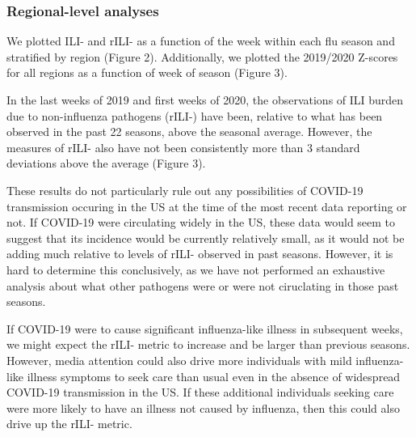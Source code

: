 \documentclass[]{article}
\begin{document}
\hypertarget{regional-level-analyses}{%
\subsubsection{Regional-level analyses}\label{regional-level-analyses}}

We plotted ILI- and rILI- as a function of the week within each flu
season and stratified by region (Figure 2). Additionally, we plotted the
2019/2020 Z-scores for all regions as a function of week of season
(Figure 3).

In the last weeks of 2019 and first weeks of 2020, the observations of
ILI burden due to non-influenza pathogens (rILI-) have been, relative to
what has been observed in the past 22 seasons, above the seasonal
average. However, the measures of rILI- also have not been consistently
more than 3 standard deviations above the average (Figure 3).

These results do not particularly rule out any possibilities of COVID-19
transmission occuring in the US at the time of the most recent data
reporting or not. If COVID-19 were circulating widely in the US, these
data would seem to suggest that its incidence would be currently
relatively small, as it would not be adding much relative to levels of
rILI- observed in past seasons. However, it is hard to determine this
conclusively, as we have not performed an exhaustive analysis about what
other pathogens were or were not ciruclating in those past seasons.

If COVID-19 were to cause significant influenza-like illness in
subsequent weeks, we might expect the rILI- metric to increase and be
larger than previous seasons. However, media attention could also drive
more individuals with mild influenza-like illness symptoms to seek care
than usual even in the absence of widespread COVID-19 transmission in
the US. If these additional individuals seeking care were more likely to
have an illness not caused by influenza, then this could also drive up
the rILI- metric.
\end{document}
